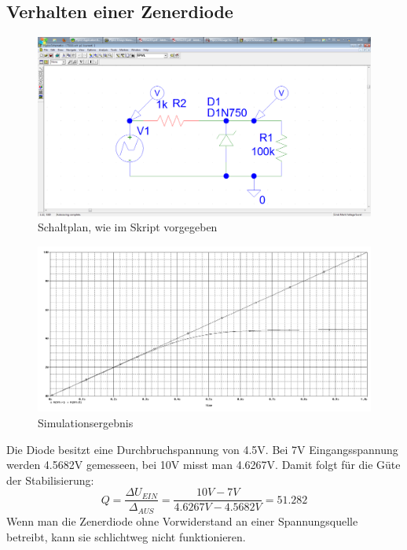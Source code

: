 \setcounter{section}{7}


\subsection{Verhalten einer Zenerdiode}
\begin{figure}[H]
	\centering
	\includegraphics[width=\linewidth]{versuch7/spice/s7111.png}
	\caption{Schaltplan, wie im Skript vorgegeben}
\end{figure}
\begin{figure}[H]
	\centering
	\includegraphics[width=\linewidth]{versuch7/spice/7111.png}
	\caption{Simulationsergebnis}
\end{figure}
Die Diode besitzt eine Durchbruchspannung von 4.5V. Bei 7V Eingangsspannung werden 4.5682V gemesseen, bei 10V misst man 4.6267V. Damit folgt für die Güte der Stabilisierung:
\[ Q=\frac{\Delta U_{EIN}}{\Delta_{AUS}} = \frac{10V-7V}{4.6267V-4.5682V}=51.282 \]
Wenn man die Zenerdiode ohne Vorwiderstand an einer Spannungsquelle betreibt, kann sie schlichtweg nicht funktionieren.


